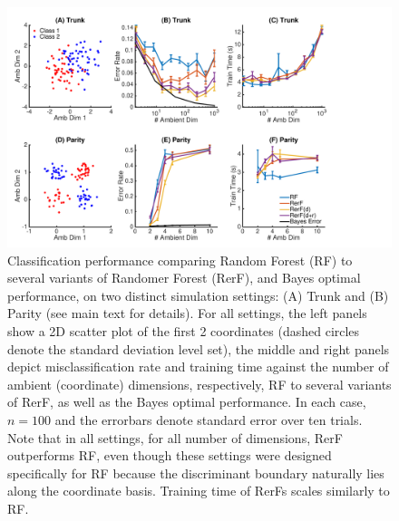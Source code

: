 \documentclass{article} %
\begin{document}


\begin{figure}[h]
\begin{center}
\includegraphics[trim=0in 0in 2in 0in, clip=true, width=\linewidth]{../Figures/pdf/Fig1_Simulation_v2}
\end{center}
\caption{Classification performance comparing Random Forest (RF) to several variants of Randomer Forest (RerF), and Bayes optimal performance, on two distinct simulation settings: (A) Trunk and (B) Parity (see main text for details).  For all settings, the left panels show a 2D scatter plot of the first 2 coordinates (dashed circles denote the standard deviation level set), the middle and right panels depict misclassification rate and training time against the number of ambient (coordinate) dimensions, respectively, RF to several variants of RerF, as well as the Bayes optimal performance. In each case, $n=100$ and the errorbars denote standard error over ten trials. Note that in all settings, for all number of dimensions, RerF outperforms RF, even though these settings were designed specifically for RF because the discriminant boundary naturally lies along the coordinate basis. Training time of RerFs scales similarly to RF. }
\label{fig:sim}
\end{figure}
\end{document}

